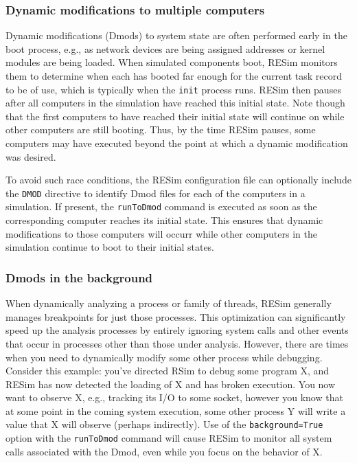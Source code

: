 \documentclass[titlepage]{article}
\begin{document}
\subsubsection{Dynamic modifications to multiple computers}
Dynamic modifications (Dmods) to system state are often performed early in the boot process, e.g.,
as network devices are being assigned addresses or kernel modules are being loaded.
When simulated components boot, RESim monitors them to determine when each has booted far enough
for the current task record to be of use, which is typically when the {\tt init} process runs.
RESim then pauses after all computers in the simulation have reached this initial state.  Note though that
the first computers to have reached their initial state will continue on while other computers are still
booting.  Thus, by the time RESim pauses, some computers may have executed beyond the point
at which a dynamic modification was desired.

To avoid such race conditions, the RESim configuration file can optionally include the {\tt DMOD} directive
to identify Dmod files for each of the computers in a simulation.  If present, the {\tt runToDmod} command is executed
as soon as the corresponding computer reaches its initial state.  This ensures that dynamic modifications
to those computers will occurr while other computers in the simulation continue to boot to their 
initial states.

\subsubsection{Dmods in the background}
\label{background_dmod}
When dynamically analyzing a process or family of threads, RESim generally manages breakpoints for just those processes.
This optimization can significantly speed up the analysis processes by entirely ignoring system calls and other events
that occur in processes other than those under analysis.  However, there are times when you need to dynamically modify some other
process while debugging.  Consider this example: you've directed RSim to debug some program X, and RESim has now detected
the loading of X and has broken execution.  You now want to observe X, e.g., tracking its I/O to some socket, however you
know that at some point in the coming system execution, some other process Y will write a value that X will observe (perhaps
indirectly).  Use of the {\tt background=True} option with the {\tt runToDmod} command will cause RESim to monitor all
system calls associated with the Dmod, even while you focus on the behavior of X. 
\end{document}
